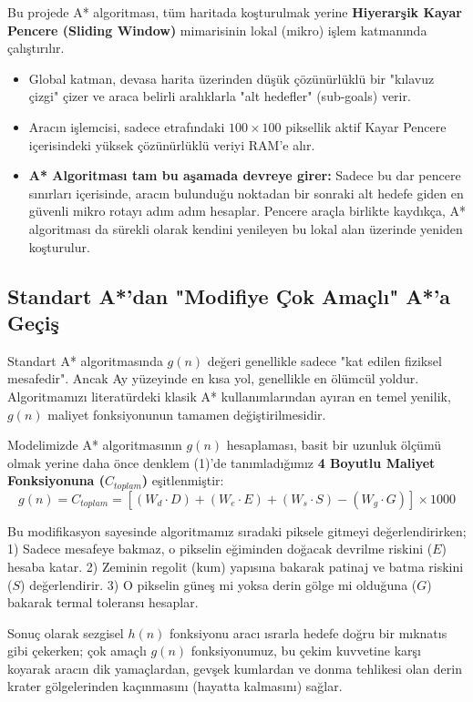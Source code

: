 \documentclass[12pt,a4paper]{article}
\begin{document}
Bu projede A* algoritması, tüm haritada koşturulmak yerine \textbf{Hiyerarşik Kayar Pencere (Sliding Window)} mimarisinin lokal (mikro) işlem katmanında çalıştırılır. 
\begin{itemize}
    \item Global katman, devasa harita üzerinden düşük çözünürlüklü bir "kılavuz çizgi" çizer ve araca belirli aralıklarla "alt hedefler" (sub-goals) verir.
    \item Aracın işlemcisi, sadece etrafındaki $100 \times 100$ piksellik aktif Kayar Pencere içerisindeki yüksek çözünürlüklü veriyi RAM'e alır. 
    \item \textbf{A* Algoritması tam bu aşamada devreye girer:} Sadece bu dar pencere sınırları içerisinde, aracın bulunduğu noktadan bir sonraki alt hedefe giden en güvenli mikro rotayı adım adım hesaplar. Pencere araçla birlikte kaydıkça, A* algoritması da sürekli olarak kendini yenileyen bu lokal alan üzerinde yeniden koşturulur.
\end{itemize}

\subsection{Standart A*'dan "Modifiye Çok Amaçlı" A*'a Geçiş}
Standart A* algoritmasında $g(n)$ değeri genellikle sadece "kat edilen fiziksel mesafedir". Ancak Ay yüzeyinde en kısa yol, genellikle en ölümcül yoldur. Algoritmamızı literatürdeki klasik A* kullanımlarından ayıran en temel yenilik, $g(n)$ maliyet fonksiyonunun tamamen değiştirilmesidir.

Modelimizde A* algoritmasının $g(n)$ hesaplaması, basit bir uzunluk ölçümü olmak yerine daha önce denklem (1)'de tanımladığımız \textbf{4 Boyutlu Maliyet Fonksiyonuna ($C_{toplam}$)} eşitlenmiştir:
\begin{equation}
g(n) = C_{toplam} = \left[ (W_d \cdot D) + (W_e \cdot E) + (W_s \cdot S) - (W_g \cdot G) \right] \times 1000
\end{equation}

Bu modifikasyon sayesinde algoritmamız sıradaki piksele gitmeyi değerlendirirken; 
1) Sadece mesafeye bakmaz, o pikselin eğiminden doğacak devrilme riskini ($E$) hesaba katar.
2) Zeminin regolit (kum) yapısına bakarak patinaj ve batma riskini ($S$) değerlendirir.
3) O pikselin güneş mi yoksa derin gölge mi olduğuna ($G$) bakarak termal toleransı hesaplar.

Sonuç olarak sezgisel $h(n)$ fonksiyonu aracı ısrarla hedefe doğru bir mıknatıs gibi çekerken; çok amaçlı $g(n)$ fonksiyonumuz, bu çekim kuvvetine karşı koyarak aracın dik yamaçlardan, gevşek kumlardan ve donma tehlikesi olan derin krater gölgelerinden kaçınmasını (hayatta kalmasını) sağlar.
\end{document}
